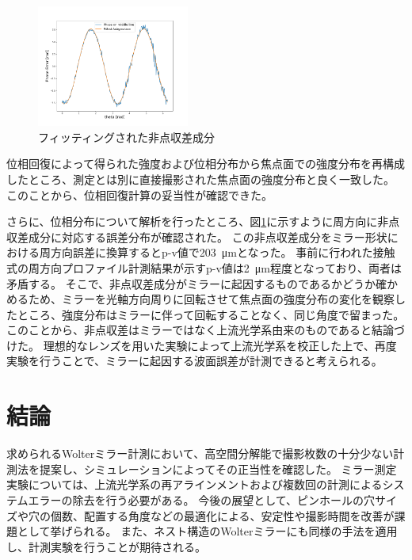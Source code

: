 \documentclass[a4j]{jarticle}
\begin{document}
\begin{figure}[!ht]
\centering
\includegraphics[width=5cm]{../thesis/chap5/figure/astigmatism_fitted.png}
\caption{フィッティングされた非点収差成分}
\label{fig:astigmatism_fitted}
\end{figure}

位相回復によって得られた強度および位相分布から焦点面での強度分布を再構成したところ、測定とは別に直接撮影された焦点面の強度分布と良く一致した。
このことから、位相回復計算の妥当性が確認できた。

さらに、位相分布について解析を行ったところ、図\ref{fig:astigmatism_fitted}に示すように周方向に非点収差成分に対応する誤差分布が確認された。
この非点収差成分をミラー形状における周方向誤差に換算するとp-v値で\SI{203}{\micro \metre}となった。
事前に行われた接触式の周方向プロファイル計測結果が示すp-v値は\SI{2}{\micro \metre}程度となっており、両者は矛盾する。
そこで、非点収差成分がミラーに起因するものであるかどうか確かめるため、ミラーを光軸方向周りに回転させて焦点面の強度分布の変化を観察したところ、強度分布はミラーに伴って回転することなく、同じ角度で留まった。
このことから、非点収差はミラーではなく上流光学系由来のものであると結論づけた。
理想的なレンズを用いた実験によって上流光学系を校正した上で、再度実験を行うことで、ミラーに起因する波面誤差が計測できると考えられる。

\section{結論}

求められるWolterミラー計測において、高空間分解能で撮影枚数の十分少ない計測法を提案し、シミュレーションによってその正当性を確認した。
ミラー測定実験については、上流光学系の再アラインメントおよび複数回の計測によるシステムエラーの除去を行う必要がある。
今後の展望として、ピンホールの穴サイズや穴の個数、配置する角度などの最適化による、安定性や撮影時間を改善が課題として挙げられる。
また、ネスト構造のWolterミラーにも同様の手法を適用し、計測実験を行うことが期待される。



\end{document}

